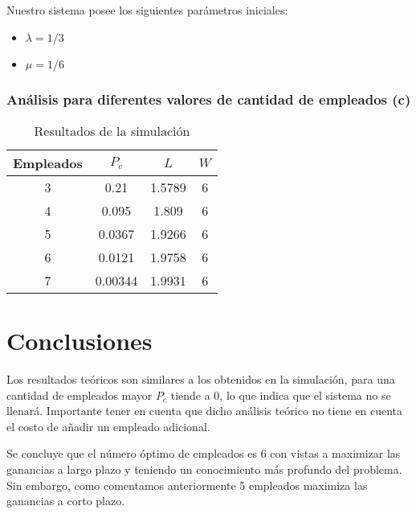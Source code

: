 \documentclass{article}
\begin{document}
Nuestro sistema posee los siguientes parámetros iniciales:
\begin{itemize}
    \item $\lambda = 1/3$
    \item $\mu = 1/6$
\end{itemize}

\subsubsection*{Análisis para diferentes valores de cantidad de empleados (c)}

\begin{table}[H]
    \centering
    \caption{Resultados de la simulación}
    \begin{tabular}{cccc}
        \toprule
        Empleados & $P_c$ & $L$ & $W$ \\
        \midrule
        3 & 0.21 & 1.5789 & 6 \\
        4 & 0.095 & 1.809 & 6 \\
        5 & 0.0367 & 1.9266 & 6 \\
        6 & 0.0121 & 1.9758 & 6 \\
        7 & 0.00344 & 1.9931 & 6 \\
        \bottomrule
    \end{tabular}
\end{table}
\section{Conclusiones}
Los resultados teóricos son similares a los obtenidos en la simulación, para una cantidad de empleados mayor $P_c$ tiende a 0, lo que indica que el sistema no se llenará. 
Importante tener en cuenta que dicho análisis teórico no tiene en cuenta el costo de añadir un empleado adicional.

Se concluye que el número óptimo de empleados es 6 con vistas a maximizar las ganancias a largo plazo y teniendo un conocimiento más profundo del problema. 
Sin embargo, como comentamos anteriormente 5 empleados maximiza las ganancias a corto plazo. 
\end{document}
